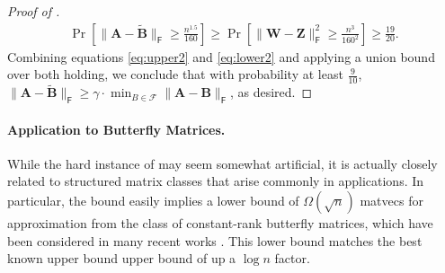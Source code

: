 \documentclass{article}[11pt]
\theoremstyle{definition}
\newcommand{\bv}[1]{\boldsymbol{\mathbf{#1}}}
\newcommand{\Fro}{\mathsf{F}}
\begin{document}
\begin{proof}[Proof of ]
\begin{align}\label{eq:lower2}
    \Pr\left [\|\bv A - \bv{\tilde B}\|_\Fro \geq \frac{n^{1.5}}{160} \right ] \geq \Pr\left [\|\bv W - \bv{Z}\|_\Fro^2 \geq \frac{n^{3}}{160^2}\right ] \ge \frac{19}{20}.
\end{align}
Combining equations \cref{eq:upper2} and \cref{eq:lower2} and applying a union bound over both holding, we conclude that with probability at least $\frac{9}{10}$,
    $\|\bv A - \bv{\tilde B}\|_\Fro \geq \gamma \cdot \min_{B\in \mathcal{F}}\|\bv A - \bv B\|_\Fro$, 
as desired.
\end{proof}

\paragraph{Application to Butterfly Matrices.}
While the hard instance of  may seem somewhat artificial, it is actually closely related to structured matrix classes that arise commonly in applications. In particular, the bound easily implies a lower bound of $\Omega(\sqrt{n})$ matvecs for approximation from the class of constant-rank butterfly matrices, which have been considered in many recent works \cite{LiYangMartin:2015,LiYang:2017,LiuXingGuo:2021}. This lower bound matches the best known upper bound upper bound of \cite{LiYang:2017} up a $\log n$ factor.
\end{document}
